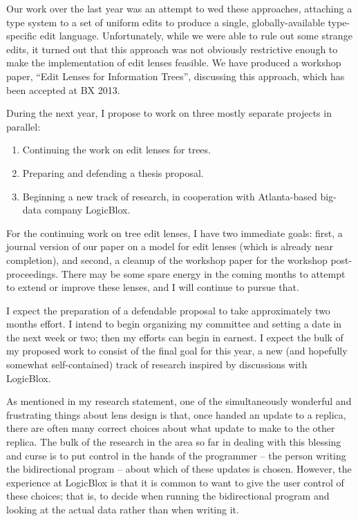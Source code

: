 \documentclass{article}
\begin{document}
Our work over the last year was an attempt to wed these approaches,
attaching a type system to a set of uniform edits to produce a single,
globally-available type-specific edit language. Unfortunately, while we were
able to rule out some strange edits, it turned out that this approach was
not obviously restrictive enough to make the implementation of edit lenses
feasible. We have produced a workshop paper, ``Edit Lenses for Information
Trees'', discussing this approach, which has been accepted at BX 2013.

During the next year, I propose to work on three mostly separate projects in
parallel:
\begin{enumerate}
    \item Continuing the work on edit lenses for trees.
    \item Preparing and defending a thesis proposal.
    \item Beginning a new track of research, in cooperation with
        Atlanta-based big-data company LogicBlox.
\end{enumerate}

For the continuing work on tree edit lenses, I have two immediate goals:
first, a journal version of our paper on a model for edit lenses (which is
already near completion), and second, a cleanup of the workshop paper for
the workshop post-proceedings. There may be some spare energy in the coming
months to attempt to extend or improve these lenses, and I will continue to
pursue that.

I expect the preparation of a defendable proposal to take approximately two
months effort. I intend to begin organizing my committee and setting a date
in the next week or two; then my efforts can begin in earnest. I expect the
bulk of my proposed work to consist of the final goal for this year, a new
(and hopefully somewhat self-contained) track of research inspired by
discussions with LogicBlox.

As mentioned in my research statement, one of the simultaneously wonderful
and frustrating things about lens design is that, once handed an update to a
replica, there are often many correct choices about what update to make to
the other replica. The bulk of the research in the area so far in dealing
with this blessing and curse is to put control in the hands of the
programmer -- the person writing the bidirectional program -- about which of
these updates is chosen. However, the experience at LogicBlox is that it is
common to want to give the user control of these choices; that is, to decide
when running the bidirectional program and looking at the actual data rather
than when writing it.
\end{document}
